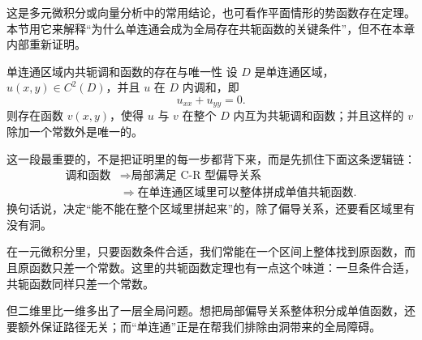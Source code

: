 \begin{zhu}{}{}
这是多元微积分或向量分析中的常用结论，也可看作平面情形的势函数存在定理。本节用它来解释``为什么单连通会成为全局存在共轭函数的关键条件''，但不在本章内部重新证明。
\end{zhu}

\begin{dingli}{单连通区域内共轭调和函数的存在与唯一性}{}
设 $D$ 是单连通区域，$u(x,y)\in C^2(D)$，并且 $u$ 在 $D$ 内调和，即
\[
    u_{xx}+u_{yy}=0.
\]
则存在函数 $v(x,y)$，使得 $u$ 与 $v$ 在整个 $D$ 内互为共轭调和函数；并且这样的 $v$ 除加一个常数外是唯一的。
\end{dingli}

\begin{tishi}
这一段最重要的，不是把证明里的每一步都背下来，而是先抓住下面这条逻辑链：
\[
    \begin{aligned}
        \text{调和函数}
        &\Longrightarrow \text{局部满足 C-R 型偏导关系}\\
        &\Longrightarrow \text{在单连通区域里可以整体拼成单值共轭函数}.
    \end{aligned}
\]
换句话说，决定``能不能在整个区域里拼起来''的，除了偏导关系，还要看区域里有没有洞。
\end{tishi}

\begin{tishi}
在一元微积分里，只要函数条件合适，我们常能在一个区间上整体找到原函数，而且原函数只差一个常数。这里的共轭函数定理也有一点这个味道：一旦条件合适，共轭函数同样只差一个常数。

但二维里比一维多出了一层全局问题。想把局部偏导关系整体积分成单值函数，还要额外保证路径无关；而``单连通''正是在帮我们排除由洞带来的全局障碍。
\end{tishi}

